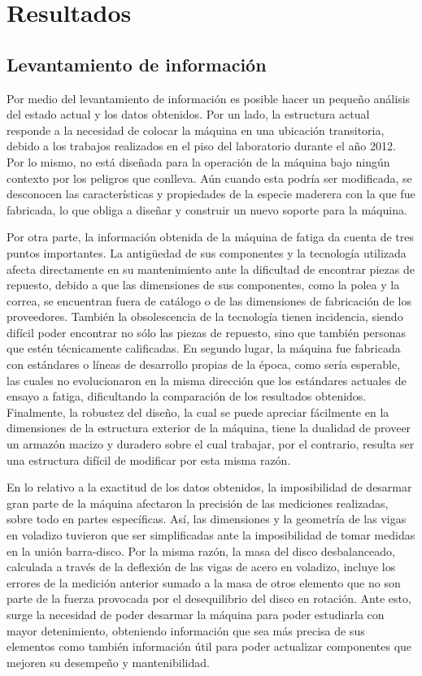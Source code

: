 \chapter{Resultados}

\section{Levantamiento de información}
Por medio del levantamiento de información es posible hacer un pequeño análisis del estado actual y los datos obtenidos. Por un lado, la estructura actual responde a la necesidad de colocar la máquina en una ubicación transitoria, debido a los trabajos realizados en el piso del laboratorio durante el año 2012. Por lo mismo, no está diseñada para la operación de la máquina bajo ningún contexto por los peligros que conlleva. Aún cuando esta podría ser modificada, se desconocen las características y propiedades de la especie maderera con la que fue fabricada, lo que obliga a diseñar y construir un nuevo soporte para la máquina. 

Por otra parte, la información obtenida de la máquina de fatiga da cuenta de tres puntos importantes. La antigüedad de sus componentes y la tecnología utilizada afecta directamente en su mantenimiento ante la dificultad de encontrar piezas de repuesto, debido a que las dimensiones de sus componentes, como la polea y la correa, se encuentran fuera de catálogo o de las dimensiones de fabricación de los proveedores. También la obsolescencia de la tecnología tienen incidencia, siendo difícil poder encontrar no sólo las piezas de repuesto, sino que también personas que estén técnicamente calificadas. En segundo lugar, la máquina fue fabricada con estándares o líneas de desarrollo propias de la época, como sería esperable, las cuales no evolucionaron en la misma dirección que los estándares actuales de ensayo a fatiga, dificultando la comparación de los resultados obtenidos. Finalmente, la robustez del diseño, la cual se puede apreciar fácilmente en la dimensiones de la estructura exterior de la máquina, tiene la dualidad de proveer un armazón macizo y duradero sobre el cual trabajar, por el contrario, resulta ser una estructura difícil de modificar por esta misma razón.

En lo relativo a la exactitud de los datos obtenidos, la imposibilidad de desarmar gran parte de la máquina afectaron la precisión de las mediciones realizadas, sobre todo en partes específicas. Así, las dimensiones y la geometría de las vigas en voladizo tuvieron que ser simplificadas ante la imposibilidad de tomar medidas en la unión barra-disco. Por la misma razón, la masa del disco desbalanceado, calculada a través de la deflexión de las vigas de acero en voladizo, incluye los errores de la medición anterior sumado a la masa de otros elemento que no son parte de la fuerza provocada por el desequilibrio del disco en rotación. Ante esto, surge la necesidad de poder desarmar la máquina para poder estudiarla con mayor detenimiento, obteniendo información que sea más precisa de sus elementos como también información útil para poder actualizar componentes que mejoren su desempeño y mantenibilidad. 
 
